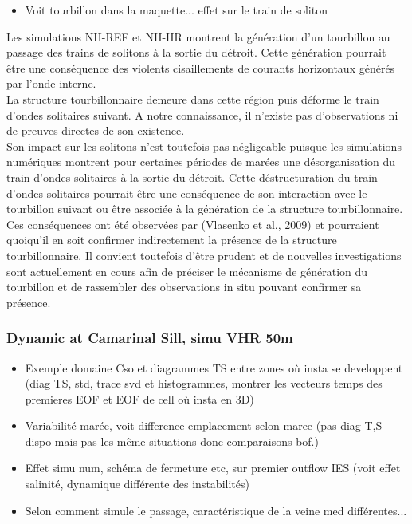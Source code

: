 \begin{itemize}
\item Voit tourbillon dans la maquette... effet sur le train de soliton
\end{itemize}


Les simulations NH-REF et NH-HR montrent la génération d'un tourbillon au passage des trains de solitons à la sortie du détroit. Cette génération pourrait être une conséquence des violents cisaillements de courants horizontaux générés par l'onde interne.\\
La structure tourbillonnaire demeure dans cette région puis déforme le train d'ondes solitaires suivant. A notre connaissance, il n'existe pas d'observations ni de preuves directes de son existence.\\
Son impact sur les solitons n'est toutefois pas négligeable puisque les simulations numériques montrent pour certaines périodes de marées une désorganisation du train d'ondes solitaires à la sortie du détroit. Cette déstructuration du train d'ondes solitaires pourrait être une conséquence de son interaction avec le tourbillon suivant ou être associée à la génération de la structure tourbillonnaire. Ces conséquences ont été observées par (Vlasenko et al., 2009) et pourraient quoiqu'il en soit confirmer indirectement la présence de la structure tourbillonnaire. Il convient toutefois d'être prudent et de nouvelles investigations sont actuellement en cours afin de préciser le mécanisme de génération du tourbillon et de rassembler des observations in situ pouvant confirmer sa présence.





\subsubsection{Dynamic at Camarinal Sill, simu VHR 50m}

\begin{itemize}
	\item Exemple domaine Cso et diagrammes TS entre zones où insta se developpent (diag TS, std, trace svd et histogrammes, montrer les vecteurs temps des premieres EOF et EOF de cell où insta en 3D)
	\item Variabilité marée, voit difference emplacement selon maree (pas diag T,S dispo mais pas les même situations donc comparaisons bof.)
	\item Effet simu num, schéma de fermeture etc, sur premier outflow IES (voit effet salinité, dynamique différente des instabilités)
	\item Selon comment simule le passage, caractéristique de la veine med différentes...
\end{itemize}


